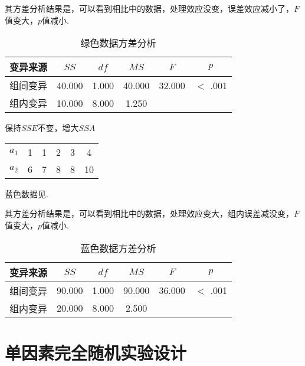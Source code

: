 其方差分析结果是，可以看到相比中的数据，处理效应没变，误差效应减小了，$F$值变大，$p$值减小.

\begin{table}[h]
	\centering
	\caption{绿色数据方差分析}
	\label{tab:aNOVA-Score}
	{
		\begin{tabular}{cccccc}
			\toprule
			变异来源 & $SS$ & $df$ & $MS$ & $F$ & $p$  \\
			\midrule
			组间变异 & 40.000 & 1.000 & 40.000 & 32.000 & $<$ .001  \\
			组内变异 & 10.000 & 8.000 & 1.250 &  &    \\
			\bottomrule
		\end{tabular}
	}
\end{table}

\begin{margintable}
    \caption{保持$SSE$不变，增大$SSA$}
    \raggedright
    \begin{tabular}{cccccc}
        \hline
        $a_1$ & 1 & 1 & 2 & 3 & 4\\
        $a_2$ & 6 & 7 & 8 & 8 & 10\\
        \hline
    \end{tabular}
\end{margintable}

蓝色数据见.

其方差分析结果是，可以看到相比中的数据，处理效应变大，组内误差减没变，$F$值变大，$p$值减小.

\begin{table}[h]
	\centering
	\caption{蓝色数据方差分析}
	\label{tab:aNOVA-Score}
	{
		\begin{tabular}{cccccc}
			\toprule
			变异来源 & $SS$ & $df$ & $MS$ & $F$ & $p$  \\
			\midrule
			组间变异 & 90.000 & 1.000 & 90.000 & 36.000 & $<$ .001  \\
			组内变异 & 20.000 & 8.000 & 2.500 &  &    \\
			\bottomrule
		\end{tabular}
	}
\end{table}




\section{单因素完全随机实验设计}
